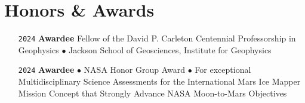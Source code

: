 \section*{Honors \& Awards}

\begin{itemize}[leftmargin=3.8em, labelsep=1.5em]
    \setlength\itemsep{-.5em}

    \item[\texttt{2024}] \textbf{Awardee} Fellow of the David P. Carleton
Centennial Professorship in Geophysics $\bullet$ Jackson School of Geosciences, Institute for Geophysics
    
    \item[\texttt{2024}] \textbf{Awardee} $\bullet$ NASA Honor Group Award $\bullet$ For exceptional Multidisciplinary Science Assessments for the International Mars Ice Mapper Mission Concept that Strongly Advance NASA Moon-to-Mars Objectives
    

\end{itemize}
